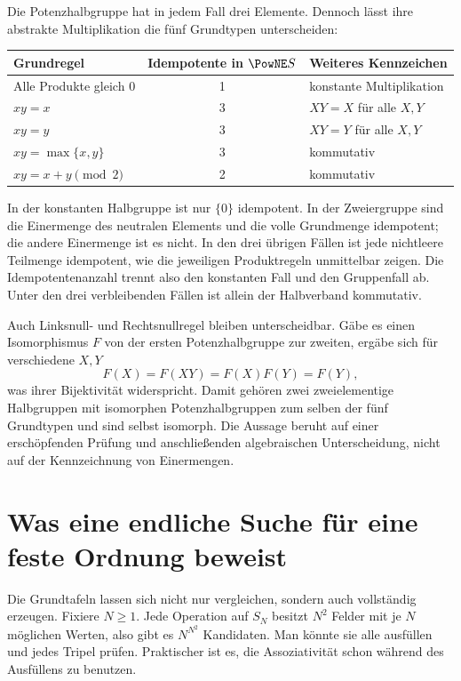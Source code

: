 Die Potenzhalbgruppe hat in jedem Fall drei Elemente. Dennoch lässt
ihre abstrakte Multiplikation die fünf Grundtypen unterscheiden:
\begin{center}
\small
\begin{tabularx}{\linewidth}{@{}>{\raggedright\arraybackslash}Xc
  >{\raggedright\arraybackslash}X@{}}
\toprule
Grundregel&Idempotente in \(\PowNE S\)&Weiteres Kennzeichen\\
\midrule
Alle Produkte gleich \(0\)&1&konstante Multiplikation\\
\(xy=x\)&3&\(XY=X\) für alle \(X,Y\)\\
\(xy=y\)&3&\(XY=Y\) für alle \(X,Y\)\\
\(xy=\max\{x,y\}\)&3&kommutativ\\
\(xy=x+y\pmod2\)&2&kommutativ\\
\bottomrule
\end{tabularx}
\end{center}
In der konstanten Halbgruppe ist nur \(\{0\}\) idempotent.
In der Zweiergruppe sind die Einermenge des neutralen Elements
und die volle Grundmenge idempotent; die andere Einermenge ist es
nicht. In den drei übrigen Fällen ist jede nichtleere Teilmenge
idempotent, wie die jeweiligen Produktregeln unmittelbar zeigen.
Die Idempotentenanzahl trennt also den konstanten Fall und den
Gruppenfall ab. Unter den drei verbleibenden Fällen ist allein der
Halbverband kommutativ.

Auch Linksnull- und Rechtsnullregel bleiben unterscheidbar.
Gäbe es einen Isomorphismus \(F\) von der ersten Potenzhalbgruppe
zur zweiten, ergäbe sich für verschiedene \(X,Y\)
\[
  F(X)=F(XY)=F(X)F(Y)=F(Y),
\]
was ihrer Bijektivität widerspricht. Damit gehören zwei
zweielementige Halbgruppen mit isomorphen Potenzhalbgruppen zum
selben der fünf Grundtypen und sind selbst isomorph. Die Aussage
beruht auf einer erschöpfenden Prüfung und anschließenden
algebraischen Unterscheidung, nicht auf der Kennzeichnung von
Einermengen.

\section*{Was eine endliche Suche für eine feste Ordnung beweist}
\hypertarget{finite-semigroups.reading.search}{}

Die Grundtafeln lassen sich nicht nur vergleichen, sondern auch
vollständig erzeugen. Fixiere \(N\geq1\). Jede Operation auf
\(S_N\) besitzt \(N^2\) Felder mit je \(N\) möglichen Werten, also
gibt es \(N^{N^2}\) Kandidaten. Man könnte sie alle ausfüllen und
jedes Tripel prüfen. Praktischer ist es, die Assoziativität schon
während des Ausfüllens zu benutzen.

